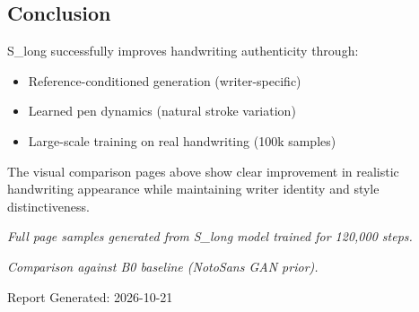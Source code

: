 \documentclass[11pt,a4paper]{article}
\begin{document}
\subsection*{Conclusion}

S\_long successfully improves handwriting authenticity through:
\begin{itemize}
  \item Reference-conditioned generation (writer-specific)
  \item Learned pen dynamics (natural stroke variation)
  \item Large-scale training on real handwriting (100k samples)
\end{itemize}

The visual comparison pages above show clear improvement in realistic handwriting appearance
while maintaining writer identity and style distinctiveness.

\vspace{2cm}

\noindent
\textit{Full page samples generated from S\_long model trained for 120,000 steps.}

\noindent
\textit{Comparison against B0 baseline (NotoSans GAN prior).}

\noindent
Report Generated: 2026-10-21
\end{document}
